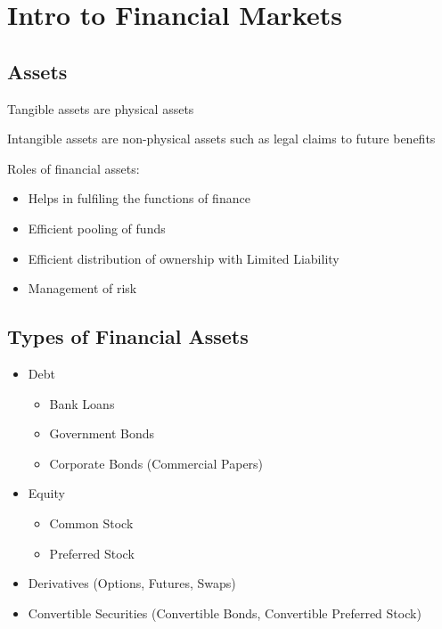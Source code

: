 \section{Intro to Financial Markets}

\subsection{Assets}
Tangible assets are physical assets

Intangible assets are non-physical assets such as legal claims to future benefits

Roles of financial assets:
\begin{itemize}
    \item Helps in fulfiling the functions of finance
    \item Efficient pooling of funds
    \item Efficient distribution of ownership with Limited Liability
    \item Management of risk
\end{itemize}

\subsection{Types of Financial Assets}
\begin{itemize}
    \item Debt
    \begin{itemize}
        \item Bank Loans
        \item Government Bonds
        \item Corporate Bonds (Commercial Papers)
    \end{itemize}
    \item Equity
    \begin{itemize}
        \item Common Stock
        \item Preferred Stock
    \end{itemize}
    \item Derivatives (Options, Futures, Swaps)
    \item Convertible Securities (Convertible Bonds, Convertible Preferred Stock)
\end{itemize}

